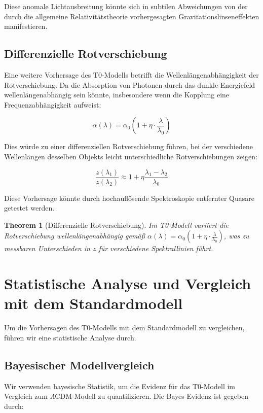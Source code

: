 \documentclass[a4paper,12pt]{article}
\newtheorem{theorem}{Theorem}[section]
\theoremstyle{definition}
\theoremstyle{remark}
\begin{document}
	Diese anomale Lichtausbreitung könnte sich in subtilen Abweichungen von der durch die allgemeine Relativitätstheorie vorhergesagten Gravitationslinseneffekten manifestieren.
	
	\subsection{Differenzielle Rotverschiebung}
	Eine weitere Vorhersage des T0-Modells betrifft die Wellenlängenabhängigkeit der Rotverschiebung. Da die Absorption von Photonen durch das dunkle Energiefeld wellenlängenabhängig sein könnte, insbesondere wenn die Kopplung eine Frequenzabhängigkeit aufweist:
	
	\begin{equation}
		\alpha(\lambda) = \alpha_0 \left(1 + \eta \cdot \frac{\lambda}{\lambda_0}\right)
	\end{equation}
	
	Dies würde zu einer differenziellen Rotverschiebung führen, bei der verschiedene Wellenlängen desselben Objekts leicht unterschiedliche Rotverschiebungen zeigen:
	
	\begin{equation}
		\frac{z(\lambda_1)}{z(\lambda_2)} \approx 1 + \eta\frac{\lambda_1 - \lambda_2}{\lambda_0}
	\end{equation}
	
	Diese Vorhersage könnte durch hochauflösende Spektroskopie entfernter Quasare getestet werden.
	
	\begin{theorem}[Differenzielle Rotverschiebung]
		Im T0-Modell variiert die Rotverschiebung wellenlängenabhängig gemäß $\alpha(\lambda) = \alpha_0 \left(1 + \eta \cdot \frac{\lambda}{\lambda_0}\right)$, was zu messbaren Unterschieden in $z$ für verschiedene Spektrallinien führt.
	\end{theorem}
	
	\section{Statistische Analyse und Vergleich mit dem Standardmodell}
	Um die Vorhersagen des T0-Modells mit dem Standardmodell zu vergleichen, führen wir eine statistische Analyse durch.
	
	\subsection{Bayesischer Modellvergleich}
	Wir verwenden bayesische Statistik, um die Evidenz für das T0-Modell im Vergleich zum $\Lambda$CDM-Modell zu quantifizieren. Die Bayes-Evidenz ist gegeben durch:
	
\end{document}
